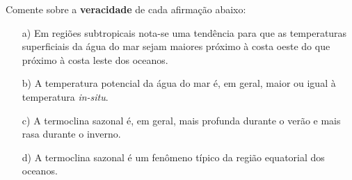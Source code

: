 \documentclass[letterpaper,portuguese,12pt,pdftex]{exam}
\begin{document}
\begin{questions}
\begin{parts}
  \begin{solution}
  \end{solution}

  \end{parts}


  \question[4]
  Comente sobre a {\bf veracidade} de cada afirmação abaixo:
  \begin{itemize}
    \item[a)] Em regiões subtropicais nota-se uma tendência para que as
              temperaturas superficiais da água do mar sejam maiores próximo à
              costa oeste do que próximo à costa leste dos oceanos.
    \item[b)] A temperatura potencial da água do mar é, em geral, maior ou igual
              à temperatura {\it in-situ}.
    \item[c)] A termoclina sazonal é, em geral, mais profunda durante o verão e
              mais rasa durante o inverno.
    \item[d)] A termoclina sazonal é um fenômeno típico da região equatorial dos
              oceanos.
  \end{itemize}

\end{questions}
\end{document}
